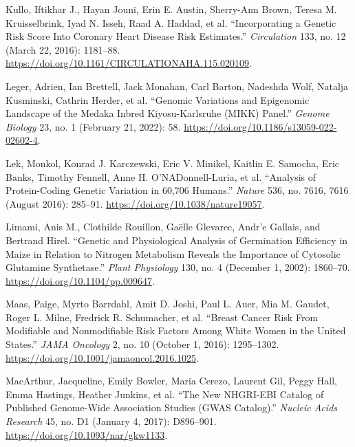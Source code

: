 \documentclass[
  9pt,
]{book}
\newlength{\cslhangindent}
\newlength{\cslentryspacingunit} %
\newenvironment{CSLReferences}[2] %
 {%
  \setlength{\parindent}{0pt}
  \ifodd #1
  \let\oldpar\par
  \def\par{\hangindent=\cslhangindent\oldpar}
  \fi
  \setlength{\parskip}{#2\cslentryspacingunit}
 }%
 {}
\begin{document}
\begin{CSLReferences}{1}{0}
\leavevmode{}%
Kullo, Iftikhar J., Hayan Jouni, Erin E. Austin, Sherry-Ann Brown, Teresa M. Kruisselbrink, Iyad N. Isseh, Raad A. Haddad, et al. {``Incorporating a {Genetic Risk Score Into Coronary Heart Disease Risk Estimates}.''} \emph{Circulation} 133, no. 12 (March 22, 2016): 1181--88. \url{https://doi.org/10.1161/CIRCULATIONAHA.115.020109}.

\leavevmode{}%
Leger, Adrien, Ian Brettell, Jack Monahan, Carl Barton, Nadeshda Wolf, Natalja Kusminski, Cathrin Herder, et al. {``Genomic Variations and Epigenomic Landscape of the {Medaka Inbred Kiyosu-Karlsruhe} ({MIKK}) Panel.''} \emph{Genome Biology} 23, no. 1 (February 21, 2022): 58. \url{https://doi.org/10.1186/s13059-022-02602-4}.

\leavevmode{}%
Lek, Monkol, Konrad J. Karczewski, Eric V. Minikel, Kaitlin E. Samocha, Eric Banks, Timothy Fennell, Anne H. O'NADonnell-Luria, et al. {``Analysis of Protein-Coding Genetic Variation in 60,706 Humans.''} \emph{Nature} 536, no. 7616, 7616 (August 2016): 285--91. \url{https://doi.org/10.1038/nature19057}.

\leavevmode{}%
Limami, Anis M., Clothilde Rouillon, Gaëlle Glevarec, Andr'e Gallais, and Bertrand Hirel. {``Genetic and {Physiological Analysis} of {Germination Efficiency} in {Maize} in {Relation} to {Nitrogen Metabolism Reveals} the {Importance} of {Cytosolic Glutamine Synthetase}.''} \emph{Plant Physiology} 130, no. 4 (December 1, 2002): 1860--70. \url{https://doi.org/10.1104/pp.009647}.

\leavevmode{}%
Maas, Paige, Myrto Barrdahl, Amit D. Joshi, Paul L. Auer, Mia M. Gaudet, Roger L. Milne, Fredrick R. Schumacher, et al. {``Breast {Cancer Risk From Modifiable} and {Nonmodifiable Risk Factors Among White Women} in the {United States}.''} \emph{JAMA Oncology} 2, no. 10 (October 1, 2016): 1295--1302. \url{https://doi.org/10.1001/jamaoncol.2016.1025}.

\leavevmode{}%
MacArthur, Jacqueline, Emily Bowler, Maria Cerezo, Laurent Gil, Peggy Hall, Emma Hastings, Heather Junkins, et al. {``The New {NHGRI-EBI Catalog} of Published Genome-Wide Association Studies ({GWAS Catalog}).''} \emph{Nucleic Acids Research} 45, no. D1 (January 4, 2017): D896--901. \url{https://doi.org/10.1093/nar/gkw1133}.


\end{CSLReferences}
\end{document}
